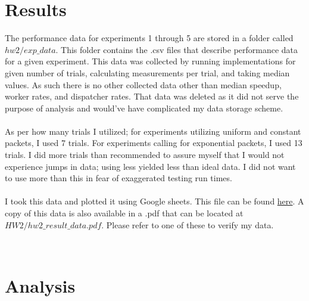 \documentclass[]{article}
\begin{document}
\section{Results}
The performance data for experiments 1 through 5 are stored in a folder called $hw2/exp\_data$. This folder contains the .csv files that describe performance data for a given experiment. This data was collected by running implementations for given number of trials, calculating measurements per trial, and taking median values. As such there is no other collected data other than median speedup, worker rates, and dispatcher rates. That data was deleted as it did not serve the purpose of analysis and would've have complicated my data storage scheme.
\\\\
As per how many trials I utilized; for experiments utilizing uniform and constant packets, I used 7 trials. For experiments calling for exponential packets, I used 13 trials. I did more trials than recommended to assure myself that I would not experience jumps in data; using less yielded less than ideal data. I did not want to use more than this in fear of exaggerated testing run times.
\\\\
I took this data and plotted it using Google sheets. This file can be found \href{https://docs.google.com/spreadsheets/d/1Vw1P-lnHN_f6wwxxaazGUFCf4o0oCOopKKm607_WKG0/edit?usp=sharing}{here}. A copy of this data is also available in a .pdf that can be located at $HW2/hw2\_result\_data.pdf$. Please refer to one of these to verify my data.

\

\section{Analysis}
\end{document}

